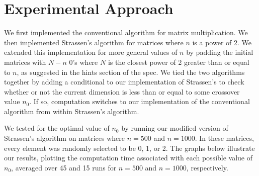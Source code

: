 \documentclass[solution, letterpaper]{cs121}
\begin{document}
\section*{Experimental Approach}

\hspace{4mm}We first implemented the conventional algorithm for matrix multiplication. We then implemented Strassen's algorithm for matrices where $n$ is a power of 2. We extended this implementation for more general values of $n$ by padding the initial matrices with $N - n$  0's where $N$ is the closest power of 2 greater than or equal to $n$, as suggested in the hints section of the spec. We tied the two algorithms together by adding a conditional to our implementation of Strassen's to check whether or not the current dimension is less than or equal to some crossover value $n_0$. If so, computation switches to our implementation of the conventional algorithm from within Strassen's algorithm. 

We tested for the optimal value of $n_0$ by running our modified version of Strassen's algorithm on matrices where $n=500$ and $n=1000$. In these matrices, every element was randomly selected to be 0, 1, or 2. The graphs below illustrate our results, plotting the computation time associated with each possible value of $n_0$, averaged over 45 and 15 runs for $n=500$ and $n=1000$, respectively.
\end{document}
